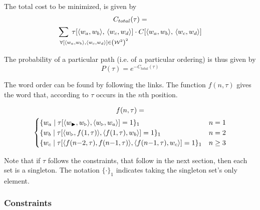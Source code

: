 \documentclass[twocolumn]{article}
\begin{document}
The total cost to be minimized, is given by
\begin{multline*}
 C_{total}(\tau)= \\
	 \sum_{\mathrlap{\!\!\!\!\forall\left[\langle w_{a},w_{b}\rangle,\langle w_{c},w_{d}\rangle\right]\in\left(\W^{2}\right)^{2}
 	}}
 	\;\tau[\langle w_{a},w_{b}\rangle,\,\langle w_{c},w_{d}\rangle] \cdot C[\langle w_{a},w_{b}\rangle,\,\langle w_{c},w_{d}\rangle]
\end{multline*}

\begin{comment}
\begin{multline*}
C_{total}(\tau)= 
\sum_{\mathclap{
		\left[w_{ab},w_{cd}\right]\in\left(\W^{2}\right)^{2}
	}}
	\;\tau[w_{ab},w_{cd}] \cdot C[w_{ab},w_{cd}]
\end{multline*}
\end{comment}

The probability of a particular path (i.e. of a particular ordering)
is thus given by 
\begin{equation*}
P(\tau)=e^{-C_{total}(\tau)}
\end{equation*}

The word order can be found by following the links. The function 
$f(n,\tau)$ gives the word that, according to $\tau$ occurs in the $n$th position.

\begin{multline*}
f(n,\tau)= \\
\begin{cases}
\{w_{a}\mid\tau[\langle w_{\blacktriangleright},w_{\triangleright}\rangle,\langle w_{\triangleright},w_{a}\rangle]=1\}_{1} & n=1\\
\{w_{b}\mid\tau[\langle w_{\triangleright},f(1,\tau)\rangle,\langle f(1,\tau),w_{b}\rangle]=1\}_{1} & n=2\\
\{w_{c}\mid\tau[\langle f(n{-}2,\tau),f(n{-}1,\tau)\rangle,\langle f(n{-}1,\tau),w_{c}\rangle]=1\}_{1} & n\ge3
\end{cases}
\end{multline*}


Note that if $\tau$ follows the constraints, that follow in the next section, then
each set is a singleton. The notation $\{\cdot\}_{1}$ indicates taking the singleton set's only element.




\subsubsection{Constraints}
\end{document}

